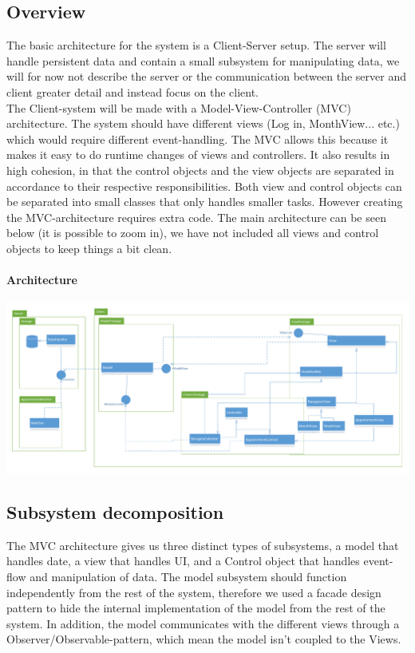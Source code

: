 \subsection{Overview}
The basic architecture for the system is a Client-Server setup. The server will handle persistent data and contain a small subsystem for manipulating data, we will for now not describe the server or the communication between the server and client greater detail and instead focus on the client.\\

The Client-system will be made with a Model-View-Controller (MVC) architecture. The system should have different views (Log in, MonthView... etc.) which would require different event-handling. The MVC allows this because it makes it easy to do runtime changes of views and controllers. It also results in high cohesion, in that the control objects and the view objects are separated in accordance to their respective responsibilities. Both view and control objects can be separated into small classes that only handles smaller tasks. However creating the MVC-architecture requires extra code. The main architecture can be seen below (it is possible to zoom in), we have not included all views and control objects to keep things a bit clean.

\paragraph{Architecture}
\begin{center}
\includegraphics[scale=.4]{sections/Architecture.pdf}
\end{center}
\pagebreak

\subsection{Subsystem decomposition}
The MVC architecture gives us three distinct types of subsystems, a model that handles date, a view that handles UI, and a Control object that handles event-flow and manipulation of data. The model subsystem should function independently from the rest of the system, therefore we used a facade design pattern to hide the internal implementation of the model from the rest of the system. In addition, the model communicates with the different views through a Observer/Observable-pattern, which mean the model isn't coupled to the Views.\\

